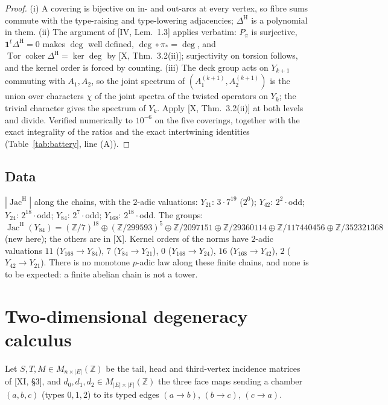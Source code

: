 \documentclass[11pt]{amsart}
\numberwithin{equation}{section}
\theoremstyle{definition}
\theoremstyle{remark}
\newcommand{\Z}{\mathbb{Z}}
\newcommand{\Jac}{\operatorname{Jac}}
\newcommand{\coker}{\operatorname{coker}}
\newcommand{\Tor}{\operatorname{Tor}}
\newcommand{\DeltaH}{\Delta^{\mathrm{H}}}
\newcommand{\JacH}{\Jac^{\mathrm{H}}}
\begin{document}
\begin{proof}
(i) A covering is bijective on in- and out-arcs at every vertex, so fibre sums commute with
the type-raising and type-lowering adjacencies; $\DeltaH$ is a polynomial in them. (ii) The
argument of [IV, Lem.~1.3] applies verbatim: $P_\pi$ is surjective, $\mathbf1^{t}\DeltaH=0$
makes $\deg$ well defined, $\deg\circ\pi_*=\deg$, and $\Tor\coker\DeltaH=\ker\deg$ by
[X, Thm.~3.2(ii)]; surjectivity on torsion follows, and the kernel order is forced by
counting. (iii) The deck group acts on $Y_{k+1}$ commuting with $A_1,A_2$, so the joint
spectrum of $(A_1^{(k+1)},A_2^{(k+1)})$ is the union over characters $\chi$ of the joint
spectra of the twisted operators on $Y_k$; the trivial character gives the spectrum of
$Y_k$. Apply [X, Thm.~3.2(ii)] at both levels and divide. Verified numerically to $10^{-6}$
on the five coverings, together with the exact integrality of the ratios and the exact
intertwining identities (Table~\ref{tab:battery}, line (A)).
\end{proof}

\subsection*{Data}
$|\JacH|$ along the chains, with the $2$-adic valuations: $Y_{21}$: $3\cdot7^{19}$ ($2^{0}$);
$Y_{42}$: $2^{2}\cdot$odd; $Y_{24}$: $2^{18}\cdot$odd; $Y_{84}$: $2^{7}\cdot$odd; $Y_{168}$:
$2^{18}\cdot$odd. The groups: $\JacH(Y_{84})=(\Z/7)^{18}\oplus(\Z/299593)^{5}\oplus\Z/2097151
\oplus\Z/29360114\oplus\Z/117440456\oplus\Z/352321368$ (new here); the others are in [X].
Kernel orders of the norms have $2$-adic valuations $11$ ($Y_{168}\to Y_{84}$), $7$
($Y_{84}\to Y_{21}$), $0$ ($Y_{168}\to Y_{24}$), $16$ ($Y_{168}\to Y_{42}$), $2$
($Y_{42}\to Y_{21}$). There is no monotone $p$-adic law along these finite chains, and none
is to be expected: a finite abelian chain is not a tower.

\section{Two-dimensional degeneracy calculus}\label{sec:calculus}

Let $S,T,M\in M_{n\times|E|}(\Z)$ be the tail, head and third-vertex incidence matrices of
[XI, \S3], and $d_0,d_1,d_2\in M_{|E|\times|F|}(\Z)$ the three face maps sending a chamber
$(a,b,c)$ (types $0,1,2$) to its typed edges $(a\to b)$, $(b\to c)$, $(c\to a)$.
\end{document}
